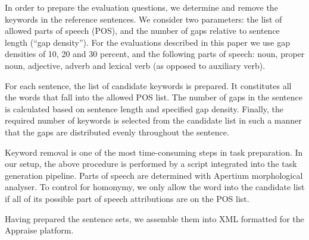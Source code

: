 \documentclass[11pt]{article}
\begin{document}
In order to prepare the evaluation questions, we determine and remove the keywords in the 
reference sentences. We consider two parameters: the list of allowed parts of speech (POS), and the 
number of gaps relative to sentence length (``gap density''). For the evaluations described in 
this paper we use gap densities of 10, 20 and 30 percent, and the following parts of speech: noun, 
proper noun, adjective, adverb and lexical verb (as opposed to auxiliary verb).

For each sentence, the list of candidate keywords is prepared. It constitutes all the words that 
fall into the allowed POS list. The number of gaps in the sentence is calculated based on 
sentence length and specified gap density. Finally, the required number of keywords is selected 
from the candidate list in such a manner that the gaps are distributed evenly throughout the sentence.

Keyword removal is one of the most time-consuming steps in task preparation. In our setup, the above procedure is performed by a script integrated into the task generation pipeline. Parts of speech are determined with Apertium morphological analyser. To control for homonymy, we only allow the word into the candidate list if all of its possible part of speech attributions are on the POS list. 

Having prepared the sentence sets, we assemble them into XML formatted for the Appraise platform.

%
\end{document}
